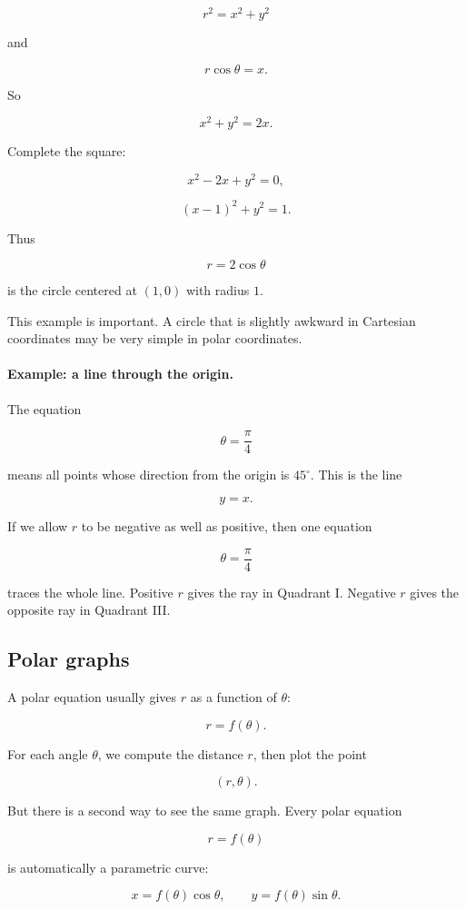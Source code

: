\[
r^2=x^2+y^2
\]

and

\[
r\cos\theta=x.
\]

So

\[
x^2+y^2=2x.
\]

Complete the square:

\[
x^2-2x+y^2=0,
\]

\[
(x-1)^2+y^2=1.
\]

Thus

\[
\boxed{
r=2\cos\theta
}
\]

is the circle centered at \((1,0)\) with radius \(1\).

This example is important.  A circle that is slightly awkward in Cartesian coordinates may
be very simple in polar coordinates.

\paragraph{Example: a line through the origin.}
The equation

\[
\theta=\frac{\pi}{4}
\]

means all points whose direction from the origin is \(45^\circ\).  This is the line

\[
y=x.
\]

If we allow \(r\) to be negative as well as positive, then one equation

\[
\theta=\frac{\pi}{4}
\]

traces the whole line.  Positive \(r\) gives the ray in Quadrant I.  Negative \(r\) gives
the opposite ray in Quadrant III.

\subsection{Polar graphs}
\label{subsec:polar-graphs}

A polar equation usually gives \(r\) as a function of \(\theta\):

\[
r=f(\theta).
\]

For each angle \(\theta\), we compute the distance \(r\), then plot the point

\[
(r,\theta).
\]

But there is a second way to see the same graph.  Every polar equation

\[
r=f(\theta)
\]

is automatically a parametric curve:

\[
\boxed{
x=f(\theta)\cos\theta,
\qquad
y=f(\theta)\sin\theta.
}
\]

